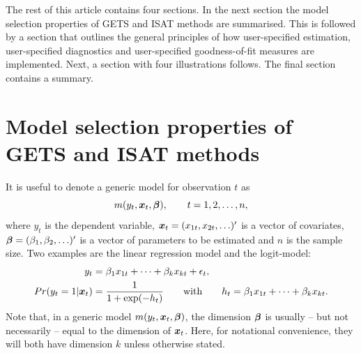 The rest of this article contains four sections. In the next section the model selection properties of GETS and ISAT methods are summarised. This is followed by a section that outlines the general principles of how user-specified estimation, user-specified diagnostics and user-specified goodness-of-fit measures are implemented. Next, a section with four illustrations follows. The final section contains a summary.

\section{Model selection properties of GETS and ISAT methods} 

It is useful to denote a generic model for observation $t$ as
%
\begin{equation}
	m(y_t, \boldsymbol{x}_t, \boldsymbol{\beta}), \qquad t=1,2,\ldots,n,
\end{equation}
%
where $y_t$ is the dependent variable, $\boldsymbol{x}_t = (x_{1t}, x_{2t}, \ldots)'$ is a vector of covariates, $\boldsymbol{\beta} = (\beta_1, \beta_2, \ldots)'$ is a vector of parameters to be estimated and $n$ is the sample size. Two examples are the linear regression model and the logit-model:
%
\begin{align}
	y_t &= \beta_1 x_{1t} + \cdots + \beta_k x_{kt} + \epsilon_t, \label{eq:linear:regression:model} \\
	Pr(y_t=1|\boldsymbol{x}_t) &= \frac{1}{1+\exp(-h_t)} \qquad\text{with}\qquad h_t = \beta_1 x_{1t} + \cdots + \beta_k x_{kt}. \label{eq:linear:logit:model}
\end{align}
%
Note that, in a generic model $m(y_t, \boldsymbol{x}_t, \boldsymbol{\beta})$, the dimension $\boldsymbol{\beta}$ is usually -- but not necessarily -- equal to the dimension of $\boldsymbol{x}_t$. Here, for notational convenience, they will both have dimension $k$ unless otherwise stated.

